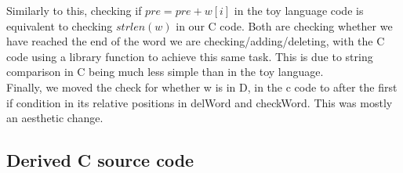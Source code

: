 \documentclass[a4paper,10pt,fleqn]{scrartcl}   	%
\begin{document}
Similarly to this, checking if $ pre = pre + w[i]$ in the toy language code is equivalent to checking $strlen(w)$ in our C code. Both are checking whether we have reached the end of the word we are checking/adding/deleting, with the C code using a library function to achieve this same task. This is due to string comparison in C being much less simple than in the toy language. \\

Finally, we moved the check for whether w is in D, in the c code to after the first if condition in its relative positions in delWord and checkWord. This was mostly an aesthetic change. 
\subsection{Derived C source code}

\end{document}
